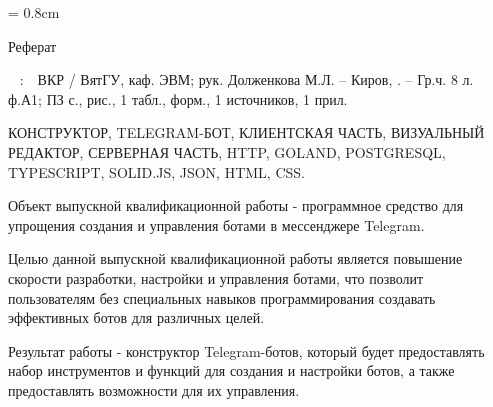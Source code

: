 
{

\topskip = 0.8cm
\begin{center}
	Реферат
\end{center}

\vspace{1em}

\authori\
\topic
:\
\mbox{\tpga}\
ВКР / ВятГУ, каф. ЭВМ; рук.
Долженкова М.Л. – Киров, \the\year. –
Гр.ч. 8 л. ф.А1;
ПЗ
 с.,
 рис.,
1 табл.,
 форм.,
1 источников,
1 прил.

\vspace{1.5em}

КОНСТРУКТОР,
TELEGRAM-БОТ,
КЛИЕНТСКАЯ ЧАСТЬ,
ВИЗУАЛЬНЫЙ РЕДАКТОР,
СЕРВЕРНАЯ ЧАСТЬ,
HTTP,
GOLAND,
POSTGRESQL,
TYPESCRIPT,
SOLID.JS,
JSON,
HTML,
CSS.

\vspace{1.5em}

Объект выпускной квалификационной работы - программное средство для упрощения
создания и управления ботами в мессенджере Telegram.

Целью данной выпускной квалификационной работы является повышение
скорости разработки, настройки и управления
ботами, что позволит пользователям
без специальных навыков
программирования создавать
эффективных ботов для различных целей.

Результат работы - конструктор Telegram-ботов,
который будет предоставлять
набор инструментов и
функций для создания и настройки
ботов, а также предоставлять
возможности для их управления.

}
